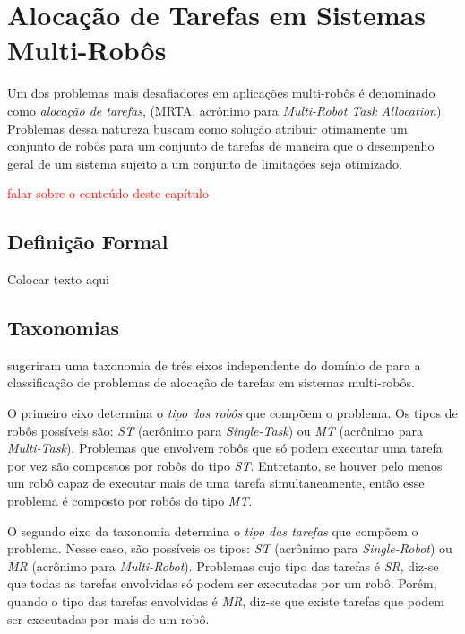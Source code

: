 \chapter[Alocação de Tarefas em Sistemas Multi-Robôs]{Alocação de Tarefas em Sistemas Multi-Robôs} \label{cap:mrta}

    Um dos problemas mais desafiadores em aplicações multi-robôs é denominado como \textit{alocação de tarefas}, (MRTA, acrônimo para \textit{Multi-Robot Task Allocation}). Problemas dessa natureza buscam como solução atribuir otimamente um conjunto de robôs para um conjunto de tarefas de maneira que o desempenho geral de um sistema sujeito a um conjunto de limitações seja otimizado.
    
    \textcolor{red}{falar sobre o conteúdo deste capítulo}
    
    \section{Definição Formal} \label{sec:sec3_1}
        Colocar texto aqui
    
    \section{Taxonomias} \label{sec:taxonomias}
        
         sugeriram uma taxonomia de três eixos independente do domínio de para a classificação de problemas de alocação de tarefas em sistemas multi-robôs. 
        
        O primeiro eixo determina o \textit{tipo dos robôs} que compõem o problema. Os tipos de robôs possíveis são: \textit{ST} (acrônimo para \textit{Single-Task}) ou \textit{MT} (acrônimo para \textit{Multi-Task}). Problemas que envolvem robôs que só podem executar uma tarefa por vez são compostos por robôs do tipo \textit{ST}. Entretanto, se houver pelo menos um robô capaz de executar mais de uma tarefa simultaneamente, então esse problema é composto por robôs do tipo \textit{MT}. 
        
        O segundo eixo da taxonomia determina o \textit{tipo das tarefas} que compõem o problema. Nesse caso, são possíveis os tipos: \textit{ST} (acrônimo para \textit{Single-Robot}) ou \textit{MR} (acrônimo para \textit{Multi-Robot}). Problemas cujo tipo das tarefas é \textit{SR}, diz-se que todas as tarefas envolvidas só podem ser executadas por um robô. Porém, quando o tipo das tarefas envolvidas é \textit{MR}, diz-se que existe tarefas que podem ser executadas por mais de um robô.
        
